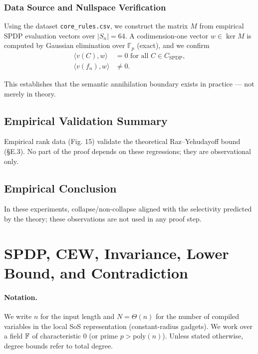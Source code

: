 \documentclass[12pt]{article}
\theoremstyle{definition}
\theoremstyle{definition}
\theoremstyle{remark}
\theoremstyle{remark}
\begin{document}
\subsubsection{Data Source and Nullspace Verification}

Using the dataset \texttt{core\_rules.csv}, we construct the matrix $M$ from empirical SPDP evaluation vectors over $|S_n| = 64$. A codimension-one vector $w \in \ker M$ is computed by Gaussian elimination over $\mathbb{F}_p$ (exact), and we confirm
\begin{align}
\langle v(C), w \rangle &= 0 \text{ for all } C \in C_{\text{SPDP}}, \\
\langle v(f_n), w \rangle &\neq 0.
\end{align}

This establishes that the semantic annihilation boundary exists in practice --- not merely in theory.

\subsection{Empirical Validation Summary}
\label{sec:empirical-validation}

Empirical rank data (Fig. 15) validate the theoretical Raz--Yehudayoff bound (§E.3).
No part of the proof depends on these regressions; they are observational only.

\subsection{Empirical Conclusion}

In these experiments, collapse/non-collapse aligned with the selectivity predicted by the theory; these observations are not used in any proof step.

\FloatBarrier  %



\section{SPDP, CEW, Invariance, Lower Bound, and Contradiction}

\paragraph{Notation.}
We write $n$ for the input length and $N{=}\Theta(n)$ for the number of compiled variables in the local SoS representation (constant-radius gadgets).
We work over a field $\Bbb F$ of characteristic $0$ (or prime $p>\mathrm{poly}(n)$). Unless stated otherwise, degree bounds refer to total degree.
\end{document}
